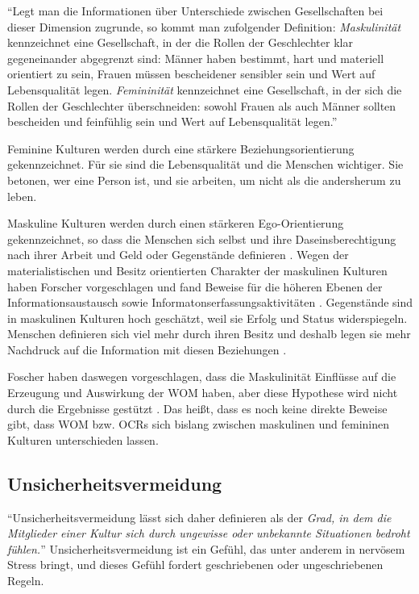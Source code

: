 ``Legt man die Informationen über Unterschiede zwischen Gesellschaften bei dieser Dimension zugrunde, so kommt man zufolgender Definition: \emph{Maskulinität} kennzeichnet eine Gesellschaft, in der die Rollen der Geschlechter klar gegeneinander abgegrenzt sind: Männer haben bestimmt, hart und materiell orientiert zu sein, Frauen müssen bescheidener sensibler sein und Wert auf Lebensqualität legen. \emph{Femininität} kennzeichnet eine Gesellschaft, in der sich die Rollen der Geschlechter überschneiden: sowohl Frauen als auch Männer sollten bescheiden und feinfühlig sein und Wert auf Lebensqualität legen.'' \citep[p. ~101]{hofstede2013interkulturelle}

Feminine Kulturen werden durch eine stärkere Beziehungsorientierung gekennzeichnet. Für sie sind die Lebensqualität und die Menschen wichtiger. Sie betonen, wer eine Person ist, und sie arbeiten, um nicht als die andersherum zu leben. \citep{Schumann2010a}

Maskuline Kulturen werden durch einen stärkeren Ego-Orientierung gekennzeichnet, so dass die Menschen sich selbst und ihre Daseinsberechtigung nach ihrer Arbeit und Geld oder Gegenstände definieren \citep{Schumann2010a}. Wegen der materialistischen und Besitz orientierten Charakter der maskulinen Kulturen haben Forscher vorgeschlagen und fand Beweise für die höheren Ebenen der Informationsaustausch sowie Informatonserfassungsaktivitäten \citep{dwyer2005exploratory, Lam2009, liu2001relationships}. Gegenstände sind in maskulinen Kulturen hoch geschätzt, weil sie Erfolg und Status widerspiegeln. Menschen definieren sich viel mehr durch ihren Besitz und deshalb legen sie mehr Nachdruck auf die Information mit diesen Beziehungen \citep{dwyer2005exploratory}. 

Foscher haben daswegen vorgeschlagen, dass die Maskulinität Einflüsse auf die Erzeugung und Auswirkung der \ac{WOM} haben, aber diese Hypothese wird nicht durch die Ergebnisse gestützt \citep{Schumann2010a, Lam2009}. Das heißt, dass es noch keine direkte Beweise gibt, dass \ac{WOM} \ac{bzw.} \ac{OCRs} sich bislang zwischen maskulinen und femininen Kulturen unterschieden lassen.
\subsection{Unsicherheitsvermeidung}
``Unsicherheitsvermeidung lässt sich daher definieren als der \emph{Grad, in dem die Mitglieder einer Kultur sich durch ungewisse oder unbekannte Situationen bedroht fühlen.}'' Unsicherheitsvermeidung ist ein Gefühl, das unter anderem in nervösem Stress bringt, und dieses Gefühl fordert geschriebenen oder ungeschriebenen Regeln. \citep[p. ~133]{hofstede2013interkulturelle}

